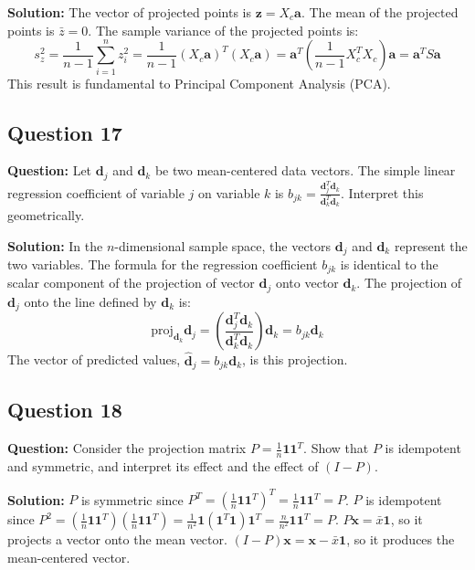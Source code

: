 \textbf{Solution:}
The vector of projected points is $\mathbf{z} = X_c \mathbf{a}$. The mean of the projected points is $\bar{z}=0$.
The sample variance of the projected points is:
$$ s_z^2 = \frac{1}{n-1} \sum_{i=1}^n z_i^2 = \frac{1}{n-1} (X_c \mathbf{a})^T (X_c \mathbf{a}) = \mathbf{a}^T \left( \frac{1}{n-1} X_c^T X_c \right) \mathbf{a} = \mathbf{a}^T S \mathbf{a} $$
This result is fundamental to Principal Component Analysis (PCA).

\subsection*{Question 17}
\textbf{Question:} Let $\mathbf{d}_j$ and $\mathbf{d}_k$ be two mean-centered data vectors. The simple linear regression coefficient of variable $j$ on variable $k$ is $b_{jk} = \frac{\mathbf{d}_j^T \mathbf{d}_k}{\mathbf{d}_k^T \mathbf{d}_k}$. Interpret this geometrically.

\textbf{Solution:}
In the $n$-dimensional sample space, the vectors $\mathbf{d}_j$ and $\mathbf{d}_k$ represent the two variables. The formula for the regression coefficient $b_{jk}$ is identical to the scalar component of the projection of vector $\mathbf{d}_j$ onto vector $\mathbf{d}_k$.
The projection of $\mathbf{d}_j$ onto the line defined by $\mathbf{d}_k$ is:
$$ \text{proj}_{\mathbf{d}_k} \mathbf{d}_j = \left( \frac{\mathbf{d}_j^T \mathbf{d}_k}{\mathbf{d}_k^T \mathbf{d}_k} \right) \mathbf{d}_k = b_{jk} \mathbf{d}_k $$
The vector of predicted values, $\hat{\mathbf{d}}_j = b_{jk}\mathbf{d}_k$, is this projection.

\subsection*{Question 18}
\textbf{Question:} Consider the projection matrix $P = \frac{1}{n}\mathbf{1}\mathbf{1}^T$. Show that $P$ is idempotent and symmetric, and interpret its effect and the effect of $(I-P)$.

\textbf{Solution:}
$P$ is symmetric since $P^T = (\frac{1}{n}\mathbf{1}\mathbf{1}^T)^T = \frac{1}{n}\mathbf{1}\mathbf{1}^T = P$.
$P$ is idempotent since $P^2 = (\frac{1}{n}\mathbf{1}\mathbf{1}^T)(\frac{1}{n}\mathbf{1}\mathbf{1}^T) = \frac{1}{n^2}\mathbf{1}(\mathbf{1}^T\mathbf{1})\mathbf{1}^T = \frac{n}{n^2}\mathbf{1}\mathbf{1}^T = P$.
$P\mathbf{x} = \bar{x}\mathbf{1}$, so it projects a vector onto the mean vector.
$(I-P)\mathbf{x} = \mathbf{x} - \bar{x}\mathbf{1}$, so it produces the mean-centered vector.

